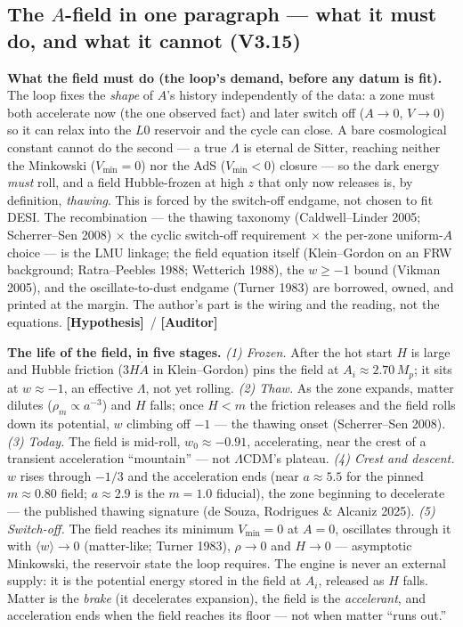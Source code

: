 \documentclass[11pt]{article}
\newcommand{\Hyp}{\textbf{\textcolor{blue!55!black}{[Hypothesis]}}}
\newcommand{\Auditor}{\textbf{\textcolor{teal!55!black}{[Auditor]}}}
\begin{document}
\subsection*{The $A$-field in one paragraph --- what it must do, and what it cannot (V3.15)}
\noindent\textbf{What the field must do (the loop's demand, before any datum is fit).} The loop fixes the \emph{shape} of $A$'s history independently of the data: a zone must both accelerate now (the one observed fact) and later switch off ($A\to0$, $V\to0$) so it can relax into the $L0$ reservoir and the cycle can close. A bare cosmological constant cannot do the second --- a true $\Lambda$ is eternal de Sitter, reaching neither the Minkowski ($V_{\min}=0$) nor the AdS ($V_{\min}<0$) closure --- so the dark energy \emph{must} roll, and a field Hubble-frozen at high $z$ that only now releases is, by definition, \emph{thawing}. This is forced by the switch-off endgame, not chosen to fit DESI. The recombination --- the thawing taxonomy (Caldwell--Linder 2005; Scherrer--Sen 2008) $\times$ the cyclic switch-off requirement $\times$ the per-zone uniform-$A$ choice --- is the LMU linkage; the field equation itself (Klein--Gordon on an FRW background; Ratra--Peebles 1988; Wetterich 1988), the $w\ge-1$ bound (Vikman 2005), and the oscillate-to-dust endgame (Turner 1983) are borrowed, owned, and printed at the margin. The author's part is the wiring and the reading, not the equations. \Hyp\ / \Auditor

\noindent\textbf{The life of the field, in five stages.} \emph{(1) Frozen.} After the hot start $H$ is large and Hubble friction ($3H\dot A$ in Klein--Gordon) pins the field at $A_i\approx2.70\,M_p$; it sits at $w\approx-1$, an effective $\Lambda$, not yet rolling. \emph{(2) Thaw.} As the zone expands, matter dilutes ($\rho_m\propto a^{-3}$) and $H$ falls; once $H<m$ the friction releases and the field rolls down its potential, $w$ climbing off $-1$ --- the thawing onset (Scherrer--Sen 2008). \emph{(3) Today.} The field is mid-roll, $w_0\approx-0.91$, accelerating, near the crest of a transient acceleration ``mountain'' --- not $\Lambda$CDM's plateau. \emph{(4) Crest and descent.} $w$ rises through $-1/3$ and the acceleration ends (near $a\approx5.5$ for the pinned $m\approx0.80$ field; $a\approx2.9$ is the $m{=}1.0$ fiducial), the zone beginning to decelerate --- the published thawing signature (de Souza, Rodrigues \& Alcaniz 2025). \emph{(5) Switch-off.} The field reaches its minimum $V_{\min}=0$ at $A=0$, oscillates through it with $\langle w\rangle\to0$ (matter-like; Turner 1983), $\rho\to0$ and $H\to0$ --- asymptotic Minkowski, the reservoir state the loop requires. The engine is never an external supply: it is the potential energy stored in the field at $A_i$, released as $H$ falls. Matter is the \emph{brake} (it decelerates expansion), the field is the \emph{accelerant}, and acceleration ends when the field reaches its floor --- not when matter ``runs out.''
\end{document}
